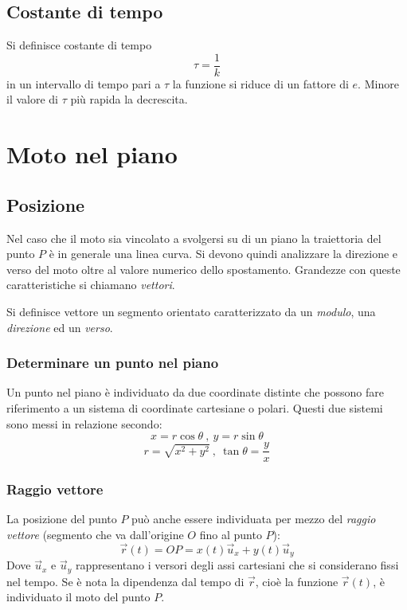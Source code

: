 \documentclass[class=book, crop=false, oneside, 12pt]{standalone}
\begin{document}
	\subsection{Costante di tempo}
	Si definisce costante di tempo
	$$\tau = \dfrac{1}{k}$$
	in un intervallo di tempo pari a $\tau$ la funzione si riduce di un fattore di $e$.
	Minore il valore di $\tau$ pi\`u rapida la decrescita.

\section{Moto nel piano}
  \subsection{Posizione}
  Nel caso che il moto sia vincolato a svolgersi su di un piano la traiettoria del punto $P$ è in generale  una linea curva.
  Si devono quindi analizzare la direzione e verso del moto oltre al valore numerico dello spostamento.
  Grandezze con queste caratteristiche si chiamano \emph{vettori}.

  Si definisce vettore un segmento orientato caratterizzato da un \emph{modulo}, una \emph{direzione} ed un \emph{verso}.
    \subsubsection{Determinare un punto nel piano}
    Un punto nel piano \`e individuato da due coordinate distinte che possono fare riferimento a un sistema di coordinate cartesiane o polari.
    Questi due sistemi sono messi in relazione secondo:
    \begin{equation}
      x = r \cos \theta \ , \ y = r \sin \theta
    \end{equation}
    \begin{equation}
      r = \sqrt{x^2 + y^2 } \ , \ \tan \theta = \frac{y}{x}
    \end{equation}
    \subsubsection{Raggio vettore}
    La posizione del punto \(P\) può anche essere individuata per mezzo del \emph{raggio vettore} (segmento che va dall'origine \(O\) fino al punto \(P\)):
    \begin{equation}
      \overrightarrow{r}(t) = OP = x(t) \overrightarrow{u}_x + y(t) \overrightarrow{u}_y
    \end{equation}
    Dove \(\overrightarrow{u}_x\) e \(\overrightarrow{u}_y\) rappresentano i versori degli assi cartesiani che si considerano fissi nel tempo.
    Se è nota la dipendenza dal tempo di \(\overrightarrow{r}\), cioè la funzione \(\overrightarrow{r}(t)\), è individuato il moto del punto \(P\).
\end{document}

